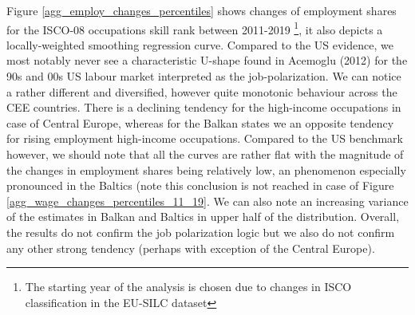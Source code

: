 \documentclass{article}
\begin{document}
Figure \ref{agg_employ_changes_percentiles} shows changes of employment shares for the ISCO-08 occupations skill rank between 2011-2019 \footnote{The starting year of the analysis is chosen due to changes in ISCO classification in the EU-SILC dataset}, it also depicts a locally-weighted smoothing regression curve. Compared to the US evidence, we most notably never see a characteristic U-shape found in Acemoglu (2012) for the 90s and 00s US labour market interpreted as the job-polarization. We can notice a rather different and diversified, however quite monotonic behaviour across the CEE countries. There is a declining tendency for the high-income occupations in case of Central Europe, whereas for the Balkan states we an opposite tendency for rising employment high-income occupations. Compared to the US benchmark however, we should note that all the curves are rather flat with the magnitude of the changes in employment shares being relatively low, an phenomenon especially pronounced in the Baltics (note this conclusion is not reached in case of Figure \ref{agg_wage_changes_percentiles_11_19}. We can also note an increasing variance of the estimates in Balkan and Baltics in upper half of the distribution. Overall, the results do not confirm the job polarization logic but we also do not confirm any other strong tendency (perhaps with exception of the Central Europe). 
\end{document}
